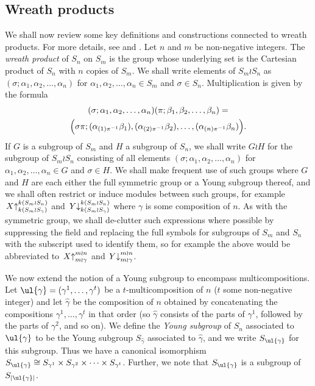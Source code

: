 \subsection{Wreath products}
We shall now review some key definitions and constructions connected to wreath products. For more details, see \cite{CHTAN} and
\cite[Chapter 4]{JAMKER}.
Let $n$ and $m$ be non-negative integers. The \textit{wreath product} of $S_n$ on $S_m$ is the group whose underlying set is the
Cartesian product of $S_n$ with $n$ copies of $S_m$. We shall write elements of $S_m{\wr}S_n$ as
$(\sigma;\alpha_1,\alpha_2,\ldots,\alpha_n)$ for $\alpha_1,\alpha_2,\ldots,\alpha_n \in S_m$ and $\sigma \in S_n$. Multiplication is given
by the formula
\begin{multline*}
	(\sigma;\alpha_1,\alpha_2,\ldots,\alpha_n)(\pi;\beta_1,\beta_2,\ldots,\beta_n) =\\
	\Bigl(\sigma\pi;(\alpha_{(1)\pi^{-1}}\beta_1),(\alpha_{(2)\pi^{-1}}\beta_2),\ldots,(\alpha_{(n)\pi^{-1}}\beta_n)\Bigr).
\end{multline*}
If $G$ is a subgroup of $S_m$ and $H$ a subgroup of $S_n$, we shall write $G{\wr}H$ for the subgroup of $S_m{\wr}S_n$
consisting of all elements $(\sigma;\alpha_1,\alpha_2,\ldots,\alpha_n)$ for $\alpha_1,\alpha_2,\ldots,\alpha_n \in G$ and $\sigma \in H$.
We shall make frequent use of such groups where $G$ and $H$ are each either the full symmetric group or a Young subgroup thereof, and we
shall often restrict or induce modules between such groups, for example
$\left.X\right\uparrow^{k(S_m{\wr}S_n)}_{k(S_m{\wr}S_\gamma)}$ and $\left.Y\right\downarrow^{k({S_m{\wr}S_n})}_{k({S_m{\wr}S_\gamma})}$
where $\gamma$ is some composition of $n$. As with the symmetric group, we shall de-clutter such expressions where possible by suppressing
the field and replacing the full symbols for subgroups of $S_m$ and $S_n$ with the subscript used to identify them,
so for example the above would be abbreviated to
$\left.X\right\uparrow^{m{\wr}n}_{m{\wr}\gamma}$ and $\left.Y\right\downarrow^{m{\wr}n}_{m{\wr}\gamma}$.

We now extend the notion of a Young subgroup to encompass multicompositions.
Let $\ul{\gamma} = (\gamma^1,\ldots,\gamma^t)$ be a $t$-multicomposition of $n$ ($t$ some non-negative integer) and let $\hat\gamma$ be
the composition of $n$ obtained by concatenating the compositions $\gamma^1,\ldots,\gamma^t$ in that order (so $\hat\gamma$ consists of
the parts of $\gamma^1$, followed by the parts of $\gamma^2$, and so on). We define the \textit{Young subgroup} of $S_n$ associated to
$\ul{\gamma}$ to be the Young subgroup $S_{\hat\gamma}$ associated to $\hat\gamma$, and we write $S_{\ul{\gamma}}$ for this subgroup. Thus we
have a canonical isomorphism $S_{\ul{\gamma}} \cong S_{\gamma^1} \times S_{\gamma^2} \times \cdots \times S_{\gamma^t}$.
Further, we note that $S_{\ul{\gamma}}$ is a subgroup of $S_{|\ul{\gamma}|}$.


